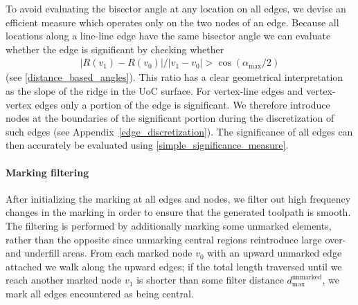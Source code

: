
To avoid evaluating the bisector angle at any location on all edges, we devise an efficient measure which operates only on the two nodes of an edge.
Because all locations along a line-line edge have the same bisector angle we can evaluate whether the edge is significant by checking whether 
\begin{align}\label{simple_significance_measure}
| R(v_1) - R(v_0) | / |v_1 - v_0| >  \cos(\alpha_\text{max} / 2)
\end{align}
(see \cref{distance_based_angles}).
This ratio has a clear geometrical interpretation as the slope of the ridge in the UoC surface.
For vertex-line edges and vertex-vertex edges only a portion of the edge is significant.
We therefore introduce nodes at the boundaries of the significant portion during the discretization of such edges (see Appendix~\ref{edge_discretization}).
The significance of all edges can then accurately be evaluated using \cref{simple_significance_measure}.






\paragraph{Marking filtering}
After initializing the marking at all edges and nodes, we filter out high frequency changes in the marking in order to ensure that the generated toolpath is smooth. 
The filtering is performed by additionally marking some unmarked elements, rather than the opposite since unmarking central regions reintroduce large over- and underfill areas.
From each marked node $v_0$ with an upward unmarked edge attached we walk along the upward edges;
if the total length traversed until we reach another marked node $v_1$ is shorter than some filter distance $d_\text{max}^\text{unmarked}$, we mark all edges encountered as being central.















